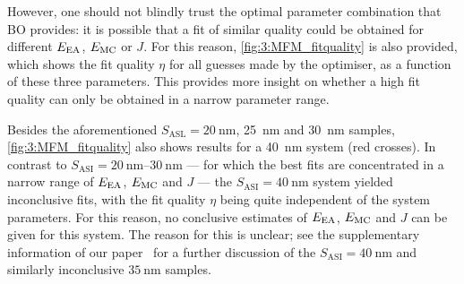 
However, one should not blindly trust the optimal parameter combination that BO provides: it is possible that a fit of similar quality could be obtained for different $E_\mathrm{EA}$, $E_\mathrm{MC}$ or $J$.
For this reason, \cref{fig:3:MFM_fitquality} is also provided, which shows the fit quality $\eta$ for all guesses made by the optimiser, as a function of these three parameters.
This provides more insight on whether a high fit quality can only be obtained in a narrow parameter range. \par
Besides the aforementioned $S_\mathrm{ASL} = \SI{20}{\nano\metre}$, \SI{25}{\nano\metre} and \SI{30}{\nano\metre} samples, \cref{fig:3:MFM_fitquality} also shows results for a \SI{40}{\nano\metre} system (red crosses).
In contrast to $S_\mathrm{ASI} = \SIrange{20}{30}{\nano\metre}$ --- for which the best fits are concentrated in a narrow range of $E_\mathrm{EA}$, $E_\mathrm{MC}$ and $J$ --- the $S_\mathrm{ASI} = \SI{40}{\nano\metre}$ system yielded inconclusive fits, with the fit quality $\eta$ being quite independent of the system parameters.
For this reason, no conclusive estimates of $E_\mathrm{EA}$, $E_\mathrm{MC}$ and $J$ can be given for this system.
The reason for this is unclear; see the supplementary information of our paper~\cite{KUR-24} for a further discussion of the $S_\mathrm{ASI} = \SI{40}{\nano\metre}$ and similarly inconclusive $\SI{35}{\nano\metre}$ samples. \\\par


